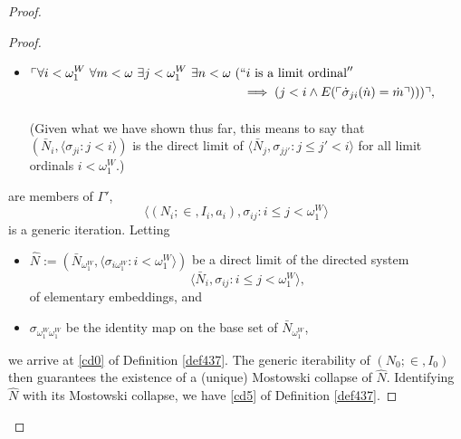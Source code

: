\documentclass[12pt]{article}
\numberwithin{equation}{section}
\begin{document}
\begin{proof}
\begin{proof}
\begin{itemize}
    \item 
    \!
    $\begin{aligned}[t]
        \ulcorner \forall i < \omega_1^W \ \forall m < \omega \ \exists j < \omega_1^W \ \exists n < \omega \ ( & ``i \text{ is a limit ordinal}'' \\ 
        & \implies  (j < i \wedge E(\ulcorner \dot{\sigma}_{ji}(\dot{n}) = \dot{m} \urcorner))) \urcorner,
    \end{aligned}$
    \\
    \\
    (Given what we have shown thus far, this means to say that $(\bar{N}_i, \langle \sigma_{ji} : j < i \rangle)$ is the direct limit of $\langle \bar{N}_j, \sigma_{jj'} : j \leq j' < i \rangle$ for all limit ordinals $i < \omega_1^W$.)
\end{itemize}
are members of $\Gamma'$, 
\begin{equation*}
    \langle (N_i; \in, I_i, a_i), \sigma_{ij} : i \leq j < \omega_1^W \rangle
\end{equation*} 
is a generic iteration. Letting 
\begin{itemize}
    \item $\hat{N} := (\bar{N}_{\omega_1^W}, \langle \sigma_{i\omega_1^W} : i < \omega_1^W \rangle)$ be a direct limit of the directed system
    \begin{equation*}
        \langle \bar{N}_i, \sigma_{ij} : i \leq j < \omega_1^W \rangle \text{,}
    \end{equation*}
    of elementary embeddings, and
    \item $\sigma_{\omega_1^W\omega_1^W}$ be the identity map on the base set of $\bar{N}_{\omega_1^W}$,
\end{itemize}
we arrive at \ref{cd0} of Definition \ref{def437}. The generic iterability of $(N_0; \in, I_0)$ then guarantees the existence of a (unique) Mostowski collapse of $\hat{N}$. Identifying $\hat{N}$ with its Mostowski collapse, we have \ref{cd5} of Definition \ref{def437}.


\end{proof}
\end{proof}
\end{document}
